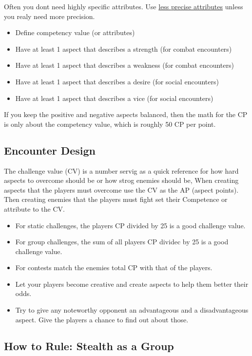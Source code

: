 \documentclass[11pt]{article}
\begin{document}
{Often you dont need highly specific attributes. Use \hyperref[sec:orgad1ec5a]{less precise attributes} unless you realy need more precision.
\begin{itemize}
\item Define competency value (or attributes)
\item Have at least 1 aspect that describes a strength (for combat encounters)
\item Have at least 1 aspect that describes a weakness (for combat encounters)
\item Have at least 1 aspect that describes a desire (for social encounters)
\item Have at least 1 aspect that describes a vice (for social encounters)
\end{itemize}
If you keep the positive and negative aspects balanced, then the math for the CP is only about the competency value, which is roughly 50 CP per point.

\subsection{Encounter Design}
\label{sec:orgf8e8bd6}

The challenge value (CV) is a number servig as a quick reference for how hard aspects to overcome should be or how strog enemies should be, When creating aspects that the players must overcome use the CV as the AP (aspect points). Then creating enemies that the players must fight set their Competence or attribute to the CV.
\begin{itemize}
\item For static challenges, the players CP divided by 25 is a good challenge value.
\item For group challenges, the sum of all players CP dividec by 25 is a good challenge value.
\item For contests match the enemies total CP with that of the players.
\item Let your players become creative and create aspects to help them better their odds.
\item Try to give any noteworthy opponent an advantageous and a disadvantageous aspect. Give the players a chance to find out about those.
\end{itemize}

\subsection{How to Rule: Stealth as a Group}
\label{sec:org5428c6d}

}
\end{document}
